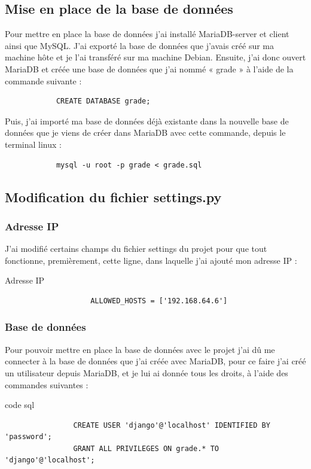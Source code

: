 \documentclass[12pt, a4paper]{article}
\begin{document}
        \subsection{Mise en place de la base de données}
        Pour mettre en place la base de données j’ai installé MariaDB-server et client ainsi que MySQL. J’ai exporté la base de données que j’avais créé sur ma machine hôte et je l’ai transféré sur ma machine Debian. Ensuite, j’ai donc ouvert MariaDB et créée une base de données que j’ai nommé « grade » à l’aide de la commande suivante : 
        \begin{verbatim}
            CREATE DATABASE grade;
        \end{verbatim}
        Puis, j’ai importé ma base de données déjà existante dans la nouvelle base de données que je viens de créer dans MariaDB avec cette commande, depuis le terminal linux : 
        \begin{verbatim}
            mysql -u root -p grade < grade.sql 
        \end{verbatim}
        \newpage
        \subsection{Modification du fichier settings.py}
            \subsubsection{Adresse IP}
            J’ai modifié certains champs du fichier settings du projet pour que tout fonctionne, premièrement, cette ligne, dans laquelle j’ai ajouté mon adresse IP : 
            \begin{listing}[H]
                \caption{Adresse IP}
                \label{lst:ip}
                \begin{verbatim}
                    ALLOWED_HOSTS = ['192.168.64.6']
                \end{verbatim}
            \end{listing}
            \subsubsection{Base de données}
            Pour pouvoir mettre en place la base de données avec le projet j’ai dû me connecter à la base de données que j’ai créée avec MariaDB, pour ce faire j’ai créé un utilisateur depuis MariaDB, et je lui ai donnée tous les droits, à l’aide des commandes suivantes :
            \begin{listing}[H]
                \caption{code sql}
                \label{lst:sql}
                \begin{verbatim}
                CREATE USER 'django'@'localhost' IDENTIFIED BY 'password';
                GRANT ALL PRIVILEGES ON grade.* TO  'django'@'localhost';
                \end{verbatim}
            \end{listing}
\end{document}
